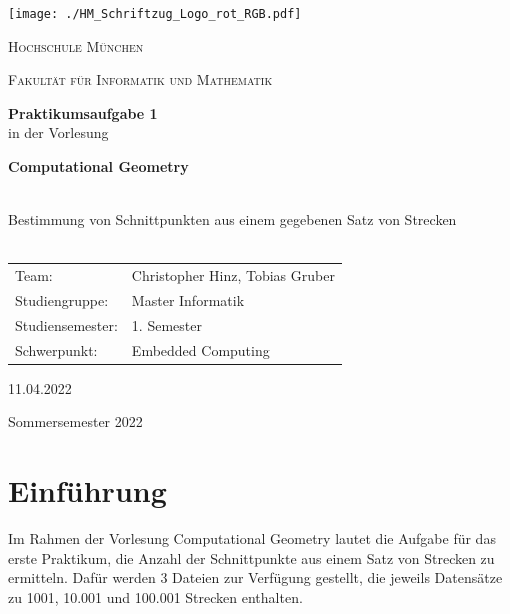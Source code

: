 \documentclass[12pt]{scrartcl}
\begin{document}
\begin{titlepage}
    \vfill
	\centering
    \texttt{[image: ./HM\_Schriftzug\_Logo\_rot\_RGB.pdf]}
    \vspace{1.5cm}

	{\scshape\LARGE Hochschule München \par}
    {\scshape\Large Fakultät für Informatik und Mathematik\par}
	\vspace{1.5cm}




    \vfill
    {\LARGE\bfseries Praktikumsaufgabe 1 \\}
    \vspace{0.5cm}
	{in der Vorlesung\\}
    \vspace{0.5cm}
    {\LARGE\bfseries Computational Geometry\\~\\ \par}
	{\LARGE Bestimmung von Schnittpunkten aus einem gegebenen Satz von Strecken\\~\\ \par}
	\vfill
    \vfill


    \begin{tabular}{ll}
    \normalsize
    Team:  & Christopher Hinz, Tobias Gruber\\
    Studiengruppe: & Master Informatik\\
    Studiensemester: & 1. Semester\\
    Schwerpunkt: & Embedded Computing\\
    \end{tabular}
    \vspace{1.5cm}

    11.04.2022

    \vspace{0.5cm}

    Sommersemester 2022

	\vfill

\end{titlepage}

\newpage

\thispagestyle{empty}
\tableofcontents
\newpage



\raggedright


\section{Einführung}
Im Rahmen der Vorlesung Computational Geometry lautet die Aufgabe für das erste Praktikum, die Anzahl der Schnittpunkte aus einem Satz von Strecken zu ermitteln.
Dafür werden 3 Dateien zur Verfügung gestellt, die jeweils Datensätze zu 1001, 10.001 und 100.001 Strecken enthalten.
\end{document}
